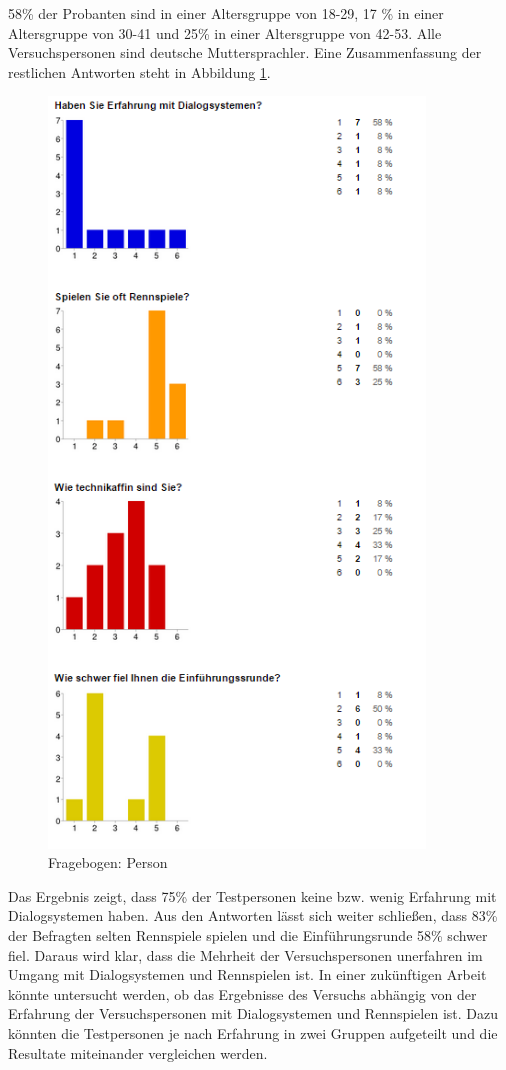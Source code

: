 \documentclass[12pt,a4paper]{scrartcl}
\begin{document}
58\% der Probanten sind in einer Altersgruppe von 18-29, 17 \% in einer Altersgruppe von 30-41 und 25\% in einer Altersgruppe von 42-53. Alle Versuchspersonen sind deutsche Muttersprachler. 
Eine Zusammenfassung der restlichen Antworten steht in Abbildung \ref{fbpersonaus}.


\begin{figure}[H]
\begin{center}
\includegraphics[width=10cm]{person1.png}
\caption{Fragebogen: Person}
\label{fbpersonaus}
\end{center}
\end{figure}
\newpage

Das Ergebnis zeigt, dass 75\% der Testpersonen keine bzw. wenig Erfahrung mit Dialogsystemen haben. Aus den Antworten lässt sich weiter schließen, dass 83\% der Befragten selten Rennspiele spielen und die Einführungsrunde 58\% schwer fiel. Daraus wird klar, dass die Mehrheit der Versuchspersonen unerfahren im Umgang mit Dialogsystemen und Rennspielen ist. In einer zukünftigen Arbeit könnte untersucht werden, ob das Ergebnisse des Versuchs abhängig von der Erfahrung der Versuchspersonen mit Dialogsystemen und Rennspielen ist. Dazu könnten die Testpersonen je nach Erfahrung in zwei Gruppen aufgeteilt und die Resultate miteinander vergleichen werden. 
\end{document}
